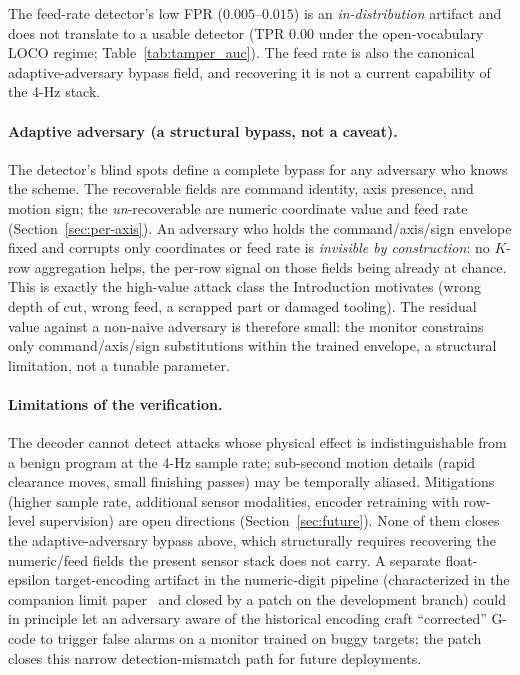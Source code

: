 \documentclass[sensors,article,submit,moreauthors,pdftex]{Definitions/mdpi}
\begin{document}
The feed-rate detector's low FPR ($0.005$--$0.015$) is an \emph{in-distribution} artifact and does not translate to a usable detector (TPR $0.00$ under the open-vocabulary LOCO regime; Table~\ref{tab:tamper_auc}). The feed rate is also the canonical adaptive-adversary bypass field, and recovering it is not a current capability of the 4-Hz stack.

\paragraph{Adaptive adversary (a structural bypass, not a caveat).} The detector's blind spots define a complete bypass for any adversary who knows the scheme. The recoverable fields are command identity, axis presence, and motion sign; the \emph{un}-recoverable are numeric coordinate value and feed rate (Section~\ref{sec:per-axis}). An adversary who holds the command/axis/sign envelope fixed and corrupts only coordinates or feed rate is \emph{invisible by construction}: no $K$-row aggregation helps, the per-row signal on those fields being already at chance. This is exactly the high-value attack class the Introduction motivates (wrong depth of cut, wrong feed, a scrapped part or damaged tooling). The residual value against a non-naive adversary is therefore small: the monitor constrains only command/axis/sign substitutions within the trained envelope, a structural limitation, not a tunable parameter.

\paragraph{Limitations of the verification.} The decoder cannot detect attacks whose physical effect is indistinguishable from a benign program at the 4-Hz sample rate; sub-second motion details (rapid clearance moves, small finishing passes) may be temporally aliased. Mitigations (higher sample rate, additional sensor modalities, encoder retraining with row-level supervision) are open directions (Section~\ref{sec:future}). None of them closes the adaptive-adversary bypass above, which structurally requires recovering the numeric/feed fields the present sensor stack does not carry. A separate float-epsilon target-encoding artifact in the numeric-digit pipeline (characterized in the companion limit paper~\cite{paperB_entropy} and closed by a patch on the development branch) could in principle let an adversary aware of the historical encoding craft ``corrected'' G-code to trigger false alarms on a monitor trained on buggy targets; the patch closes this narrow detection-mismatch path for future deployments.
\end{document}
